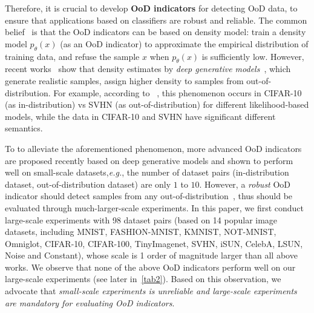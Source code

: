 \documentclass[letterpaper]{article} %
\newcommand{\EG}{\textit{e.g.}, }
\begin{document}
Therefore, it is crucial to develop \textbf{OoD indicators} for detecting OoD data, to ensure that applications based on classifiers are robust and reliable. The common belief~\cite{bishop1994novelty} is that  the OoD indicators can be based on density model: train a density model $p_\theta(x)$ (as an OoD indicator) to approximate the empirical distribution of training data, and refuse the sample $x$ when $p_\theta(x)$ is sufficiently low. 
However, recent works~\cite{nalisnick2019do,choi2018waic,hendrycks2018deep} show that density estimates by \textit{deep generative models}~\cite{dinh2016density,tomczak2018vae,takahashi2019variational,van2016conditional}, which generate realistic samples, assign higher density to samples from out-of-distribution. For example, according to ~\cite{nalisnick2019do}, this phenomenon occurs in CIFAR-10 (as in-distribution) vs SVHN (as out-of-distribution) for different likelihood-based models, while the data in CIFAR-10 and SVHN have significant different semantics. 

To to alleviate the aforementioned phenomenon, more advanced OoD indicators \cite{serra2019input,song2017pixeldefend,choi2018waic,ren2019likelihood,song2019unsupervised,che2019deep} are proposed recently based on deep generative models and shown to perform well on small-scale datasets,\EG the number of dataset pairs (in-distribution dataset, out-of-distribution dataset) are only $1$ to $10$. 
However, a \textit{robust} OoD indicator should detect samples from any out-of-distribution~\cite{chen2020robust}, thus should be evaluated through much-larger-scale experiments. In this paper, we first conduct large-scale experiments with 98 dataset pairs (based on 14 popular image datasets, including MNIST, FASHION-MNIST, KMNIST, NOT-MNIST, Omniglot, CIFAR-10, CIFAR-100, TinyImagenet, SVHN, iSUN, CelebA, LSUN, Noise and Constant), whose scale is 1 order of magnitude larger than all above works. We observe that none of the above OoD indicators perform well on our large-scale experiments (see later in~\cref{tab2}). Based on this observation, we advocate that \textit{small-scale experiments is unreliable and large-scale experiments are mandatory for evaluating OoD indicators}.
\end{document}
